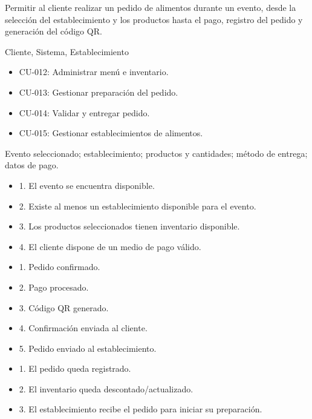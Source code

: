 \begin{description}[leftmargin=!, labelwidth=3.4cm, style=nextline, topsep=3pt]
\item[Objetivo] Permitir al cliente realizar un pedido de alimentos durante un evento, desde la selección del establecimiento y los productos hasta el pago, registro del pedido y generación del código QR.

\item[Actores] Cliente, Sistema, Establecimiento

\item[CU relacionados] \hfill
\begin{itemize}[leftmargin=1.2em, topsep=1pt]
  \item CU-012: Administrar menú e inventario.
  \item CU-013: Gestionar preparación del pedido.
  \item CU-014: Validar y entregar pedido.
  \item CU-015: Gestionar establecimientos de alimentos.
\end{itemize}

\item[Entradas] Evento seleccionado; establecimiento; productos y cantidades; método de entrega; datos de pago.

\item[Pre-condiciones] \hfill
\begin{itemize}[leftmargin=1.2em, topsep=1pt]
  \item 1. El evento se encuentra disponible.
  \item 2. Existe al menos un establecimiento disponible para el evento.
  \item 3. Los productos seleccionados tienen inventario disponible.
  \item 4. El cliente dispone de un medio de pago válido.
\end{itemize}

\item[Salidas] \hfill
\begin{itemize}[leftmargin=1.2em, topsep=1pt]
  \item 1. Pedido confirmado.
  \item 2. Pago procesado.
  \item 3. Código QR generado.
  \item 4. Confirmación enviada al cliente.
  \item 5. Pedido enviado al establecimiento.
\end{itemize}

\item[Post-condiciones] \hfill
\begin{itemize}[leftmargin=1.2em, topsep=1pt]
  \item 1. El pedido queda registrado.
  \item 2. El inventario queda descontado/actualizado.
  \item 3. El establecimiento recibe el pedido para iniciar su preparación.
\end{itemize}

\end{description}

